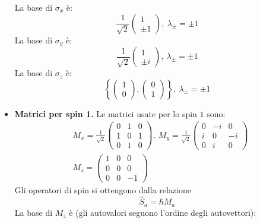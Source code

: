 \documentclass[11pt, a4paper]{scrartcl} %
\numberwithin{equation}{section}
\theoremstyle{style2}
\theoremstyle{style1}
\begin{document}
\begin{multicols}{2}
\begin{itemize}
			La base di $\sigma _x$ \`e:
			\begin{equation}
				\frac{1}{\sqrt{2} } \begin{pmatrix} 1 \\ \pm 1 \end{pmatrix} , \ \lambda _\pm = \pm 1
			\end{equation}
			La base di $\sigma _y$ \`e:
			\begin{equation}
				\frac{1}{\sqrt{2} } \begin{pmatrix} 1 \\ \pm i \end{pmatrix} , \ \lambda _\pm = \pm 1
			\end{equation}
			La base di $\sigma _z$ \`e:
			\begin{equation}
				\left\{ \begin{pmatrix} 1\\ 0 \end{pmatrix} , \begin{pmatrix} 0 \\ 1 \end{pmatrix}  \right\} , \ \lambda _\pm = \pm 1
			\end{equation}
			\item {\sffamily \bfseries Matrici per spin 1.} Le matrici usate per lo spin $1$ sono:
				\begin{equation}
					\begin{split}
						&M_x =\frac{1}{\sqrt{2} } \begin{pmatrix} 0& 1 & 0 \\ 1& 0& 1 \\ 0&1 &0 \end{pmatrix}, \ M_y = \frac{1}{\sqrt{2} } \begin{pmatrix} 0&-i & 0 \\ i& 0& -i\\ 0& i &0 \end{pmatrix} \\
						&M_z = \begin{pmatrix} 1 & 0&0\\ 0&0&0\\ 0&0&-1 \end{pmatrix} 
					\end{split}
				\end{equation}
				Gli operatori di spin si ottengono dalla relazione
				\begin{equation}
					\hat{S}_a = \hbar M_a
				\end{equation}
				La base di $M_z$ \`e (gli autovalori seguono l'ordine degli autovettori):

\end{itemize}
\end{multicols}
\end{document}
